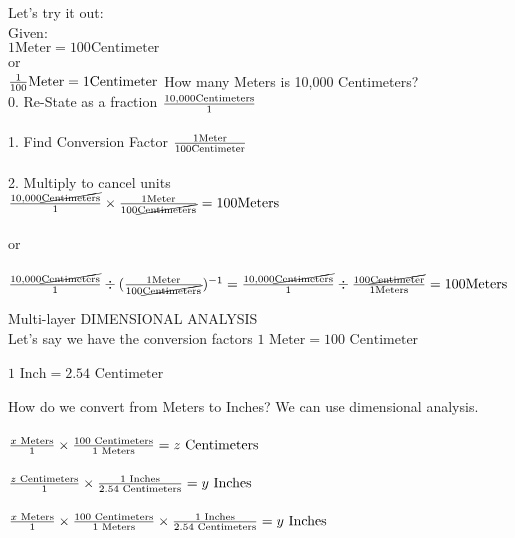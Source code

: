 \documentclass[14pt]{extarticle}
\begin{document}
    \pagebreak
    \normalsize \flushleft
    Let's try it out:\\
    Given:\\
    \center
    $ 1 \text{Meter} = 100 \text{Centimeter} $
    \\ or \\
    $ {1 \over 100} \text{Meter} = 1 \text{Centimeter} $
    \flushleft
    \normalsize \flushleft
    How many Meters is 10,000 Centimeters?\\
    \large
    \hspace{2 cm} 0. Re-State as a fraction
        ${10,000 \text{Centimeters} \over 1}$
    \\~\\\hspace{2 cm} 1. Find Conversion Factor
        ${1 \text{Meter} \over 100 \text{Centimeter}}$
    \\~\\\hspace{2 cm} 2. Multiply to cancel units \\
        \center
        ${10,000 \cancel{\text{Centimeters}} \over 1} \times {1 \text{Meter} \over 100 \cancel{\text{Centimeters}}} = 100 \text{Meters}$
        \\~\\ or \\~\\
        $ {10,000 \cancel{\text{Centimeters}} \over 1} \div ({1 \text{Meter} \over 100 \cancel{\text{Centimeters}}})^{-1} = {10,000 \cancel{\text{Centimeters}} \over 1} \div {100 \cancel{\text{Centimeter}} \over 1 \text{Meters}} = 100 \text{Meters} $
    
    
    
    \flushleft \normalsize
    \pagebreak
    \flushleft
    Multi-layer DIMENSIONAL ANALYSIS\\
    \normalsize
    Let's say we have the conversion factors
    \center
    $ 1 \text{ Meter} = 100 \text{ Centimeter} $\\~\\
    $ 1 \text{ Inch} = 2.54 \text{ Centimeter} $
    \\~\\ \flushleft
    How do we convert from Meters to Inches? We can use dimensional analysis.
    \\~\\
    \center \large
    $ {x \text{ Meters} \over 1} \times {100 \text{ Centimeters} \over 1 \text{ Meters}} = z \text{ Centimeters} $\\~\\
    $ {z \text{ Centimeters} \over 1} \times {1 \text{ Inches} \over 2.54 \text{ Centimeters}} = y \text{ Inches} $
    \\~\\
    $ {x \text{ Meters} \over 1} \times {100 \text{ Centimeters} \over 1 \text{ Meters}} \times {1 \text{ Inches} \over 2.54 \text{ Centimeters}} = y \text{ Inches} $
    
\end{document}
